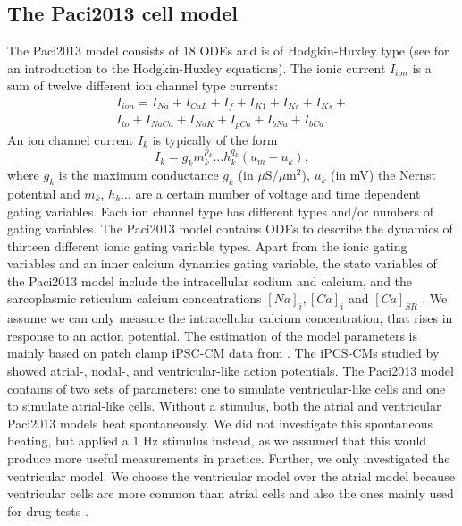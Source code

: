 \documentclass[12pt,a4paper]{article}
\begin{document}
\subsection{The Paci2013 cell model} \label{The Paci2013 cell model}
The Paci2013 model consists of 18 ODEs and is of Hodgkin-Huxley type (see \cite[p. 195-215]{KeenerI} for an introduction to the Hodgkin-Huxley equations). The ionic current $I_{ion}$ is a sum of twelve different ion channel type currents:
\begin{eqnarray}
I_{ion}=I_{Na}+I_{CaL}+I_f+I_{K1}+I_{Kr}+I_{Ks}+ \\
I_{to}+I_{NaCa}+I_{NaK}+I_{pCa}+I_{bNa}+I_{bCa}.
\end{eqnarray}
An ion channel current $I_k$ is typically of the form 
\begin{equation}
I_{k}=g_k m_k^{p_k}\ldots h_k^{q_k}(u_m-u_k),
\end{equation}
where $g_k$ is the maximum conductance $g_k$ (in $\mu$S/$\mu$m$^2$), $u_k$ (in mV) the Nernst potential and $m_k$, $h_k \ldots$ are a certain number of voltage and time dependent gating variables. Each ion channel type has different types and/or numbers of gating variables. The Paci2013 model contains ODEs to describe the dynamics of thirteen different ionic gating variable types. Apart from the ionic gating variables and an inner calcium dynamics gating variable, the state variables of the Paci2013 model include the intracellular sodium and calcium, and the sarcoplasmic reticulum calcium concentrations $[Na]_i, [Ca]_i$ and $[Ca]_{SR}$ \cite{Paci2013}. We assume we can only measure the intracellular calcium concentration, that rises in response to an action potential. The estimation of the model parameters is mainly based on patch clamp iPSC-CM data from \cite{Ma2011}. The iPCS-CMs studied by \cite{Ma2011} showed atrial-, nodal-, and ventricular-like action potentials. The Paci2013 model contains of two sets of parameters: one to simulate ventricular-like cells and one to simulate atrial-like cells. Without a stimulus, both the atrial and ventricular Paci2013 models beat spontaneously. We did not investigate this spontaneous beating, but applied a 1 Hz stimulus instead, as we assumed that this would produce more useful measurements in practice. Further, we only investigated the ventricular model. We choose the ventricular model over the atrial model because ventricular cells are more common than atrial cells and also the ones mainly used for drug tests \cite{Paci2015}.
%
\end{document}
